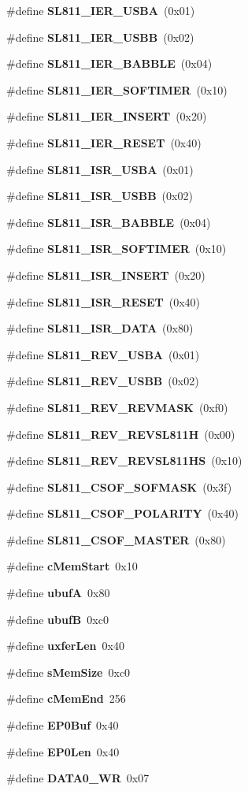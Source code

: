 \begin{CompactItemize}
\#define {\bf SL811\_\-IER\_\-USBA}~(0x01)
\item 
\#define {\bf SL811\_\-IER\_\-USBB}~(0x02)
\item 
\#define {\bf SL811\_\-IER\_\-BABBLE}~(0x04)
\item 
\#define {\bf SL811\_\-IER\_\-SOFTIMER}~(0x10)
\item 
\#define {\bf SL811\_\-IER\_\-INSERT}~(0x20)
\item 
\#define {\bf SL811\_\-IER\_\-RESET}~(0x40)
\item 
\#define {\bf SL811\_\-ISR\_\-USBA}~(0x01)
\item 
\#define {\bf SL811\_\-ISR\_\-USBB}~(0x02)
\item 
\#define {\bf SL811\_\-ISR\_\-BABBLE}~(0x04)
\item 
\#define {\bf SL811\_\-ISR\_\-SOFTIMER}~(0x10)
\item 
\#define {\bf SL811\_\-ISR\_\-INSERT}~(0x20)
\item 
\#define {\bf SL811\_\-ISR\_\-RESET}~(0x40)
\item 
\#define {\bf SL811\_\-ISR\_\-DATA}~(0x80)
\item 
\#define {\bf SL811\_\-REV\_\-USBA}~(0x01)
\item 
\#define {\bf SL811\_\-REV\_\-USBB}~(0x02)
\item 
\#define {\bf SL811\_\-REV\_\-REVMASK}~(0xf0)
\item 
\#define {\bf SL811\_\-REV\_\-REVSL811H}~(0x00)
\item 
\#define {\bf SL811\_\-REV\_\-REVSL811HS}~(0x10)
\item 
\#define {\bf SL811\_\-CSOF\_\-SOFMASK}~(0x3f)
\item 
\#define {\bf SL811\_\-CSOF\_\-POLARITY}~(0x40)
\item 
\#define {\bf SL811\_\-CSOF\_\-MASTER}~(0x80)
\item 
\#define {\bf c\-Mem\-Start}~0x10
\item 
\#define {\bf ubuf\-A}~0x80
\item 
\#define {\bf ubuf\-B}~0xc0
\item 
\#define {\bf uxfer\-Len}~0x40
\item 
\#define {\bf s\-Mem\-Size}~0xc0
\item 
\#define {\bf c\-Mem\-End}~256
\item 
\#define {\bf EP0Buf}~0x40
\item 
\#define {\bf EP0Len}~0x40
\item 
\#define {\bf DATA0\_\-WR}~0x07
\item 

\end{CompactItemize}
